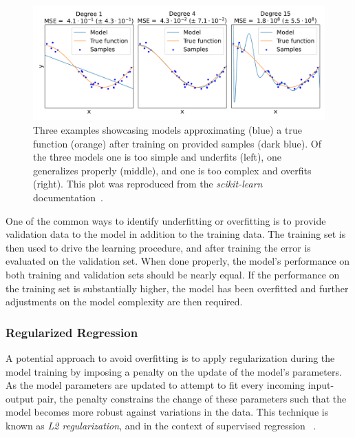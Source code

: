 \begin{figure}[!htb]
    \centering
    \includegraphics*[width=\textwidth]{Figures/ML_for_IR_Coupling/ml_underfitting_overfitting.pdf}
    \caption{Three examples showcasing models approximating (\textcolor{mplblue}{blue}) a true function (\textcolor{mplorange}{orange}) after training on provided samples (\textcolor{mplb}{dark blue}). Of the three models one is too simple and underfits (left), one generalizes properly (middle), and one is too complex and overfits (right). This plot was reproduced from the \textit{scikit-learn} documentation~\cite{CODE:scikit-learn, Website:ScikitLearn:Overfitting_Example}.}
    \label{figure:ml_underfitting_overfitting}
\end{figure}

One of the common ways to identify underfitting or overfitting is to provide validation data to the model in addition to the training data.
The training set is then used to drive the learning procedure, and after training the error is evaluated on the validation set.
When done properly, the model's performance on both training and validation sets should be nearly equal.
If the performance on the training set is substantially higher, the model has been overfitted and further adjustments on the model complexity are then required.

\subsubsection*{Regularized Regression}

A potential approach to avoid overfitting is to apply regularization during the model training by imposing a penalty on the update of the model's parameters.
As the model parameters are updated to attempt to fit every incoming input-output pair, the penalty constrains the change of these parameters such that the model becomes more robust against variations in the data.
This technique is known as \textit{L2 regularization}, and in the context of supervised regression ~\cite{MIT:Rifkin:Regularized_Least_Squares}.

